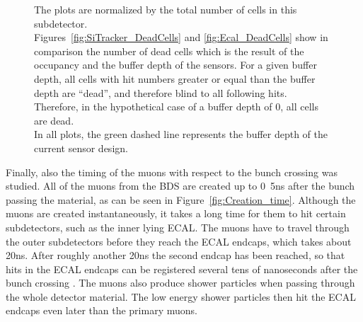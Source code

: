\begin{figure}
{    The plots are normalized by the total number of cells in this subdetector.\\
    Figures~\ref{fig:SiTracker_DeadCells} and \ref{fig:Ecal_DeadCells} show in comparison the number of dead cells which is the result of the occupancy and the buffer depth of the sensors.
    For a given buffer depth, all cells with hit numbers greater or equal than the buffer depth are ``dead'', and therefore blind to all following hits.
    Therefore, in the hypothetical case of a buffer depth of 0, all cells are dead.\\
    In all plots, the green dashed line represents the buffer depth of the current sensor design.
    }
    \label{fig:Occupancy_DeadCells}
\end{figure}

Finally, also the timing of the muons with respect to the bunch crossing was studied.
All of the muons from the BDS are created up to \unit{0.5}{ns} after the bunch passing the material, as can be seen in Figure~\ref{fig:Creation_time}.
Although the muons are created instantaneously, it takes a long time for them to hit certain subdetectors, such as the inner lying ECAL.
The muons have to travel through the outer subdetectors before they reach the ECAL endcaps, which takes about \unit{20}{ns}.
After roughly another \unit{20}{ns} the second endcap has been reached, so that hits in the ECAL endcaps can be registered several tens of nanoseconds after the bunch crossing .
The muons also produce shower particles when passing through the whole detector material.
The low energy shower particles then hit the ECAL endcaps even later than the primary muons.

